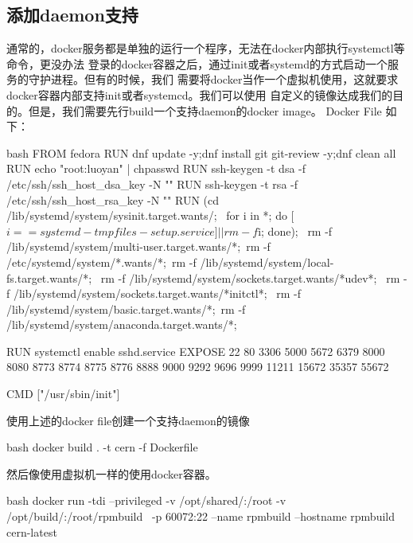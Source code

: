 \subsection{添加daemon支持}
通常的，docker服务都是单独的运行一个程序，无法在docker内部执行systemctl等命令，更没办法
登录的docker容器之后，通过init或者systemd的方式启动一个服务的守护进程。但有的时候，我们
需要将docker当作一个虚拟机使用，这就要求docker容器内部支持init或者systemcd。我们可以使用
自定义的镜像达成我们的目的。但是，我们需要先行build一个支持daemon的docker image。
Docker File 如下：
\begin{code-block}{bash}
FROM fedora
RUN dnf update -y;dnf install git git-review -y;dnf clean all
RUN echo "root:luoyan" | chpasswd
RUN ssh-keygen -t dsa -f /etc/ssh/ssh_host_dsa_key -N ""
RUN ssh-keygen -t rsa -f /etc/ssh/ssh_host_rsa_key -N ""
RUN (cd /lib/systemd/system/sysinit.target.wants/; \
for i in *; do [ $i == systemd-tmpfiles-setup.service ] || rm -f $i; done); \
rm -f /lib/systemd/system/multi-user.target.wants/*;\
rm -f /etc/systemd/system/*.wants/*;\
rm -f /lib/systemd/system/local-fs.target.wants/*; \
rm -f /lib/systemd/system/sockets.target.wants/*udev*; \
rm -f /lib/systemd/system/sockets.target.wants/*initctl*; \
rm -f /lib/systemd/system/basic.target.wants/*;\
rm -f /lib/systemd/system/anaconda.target.wants/*;

RUN systemctl enable sshd.service
EXPOSE 22 80 3306 5000 5672 6379 8000 8080 8773 8774 8775 8776 8888 9000 9292 9696 9999 11211 15672 35357 55672

CMD ["/usr/sbin/init"]
\end{code-block}

使用上述的docker file创建一个支持daemon的镜像
\begin{code-block}{bash}
docker build . -t cern -f Dockerfile
\end{code-block}

然后像使用虚拟机一样的使用docker容器。
\begin{code-block}{bash}
docker run -tdi --privileged -v /opt/shared/:/root -v /opt/build/:/root/rpmbuild \
    -p 60072:22 --name rpmbuild --hostname rpmbuild cern-latest
\end{code-block}

